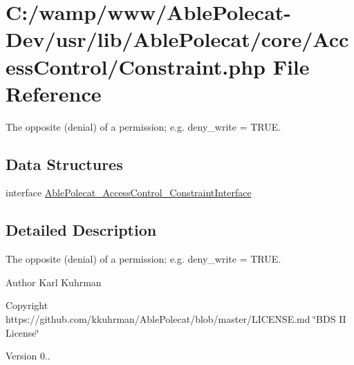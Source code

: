 \hypertarget{_constraint_8php}{}\section{C\+:/wamp/www/\+Able\+Polecat-\/\+Dev/usr/lib/\+Able\+Polecat/core/\+Access\+Control/\+Constraint.php File Reference}
\label{_constraint_8php}


The opposite (denial) of a permission; e.\+g. deny\+\_\+write = T\+R\+U\+E.  


\subsection*{Data Structures}
\begin{DoxyCompactItemize}
\item 
interface \hyperlink{interface_able_polecat___access_control___constraint_interface}{Able\+Polecat\+\_\+\+Access\+Control\+\_\+\+Constraint\+Interface}
\end{DoxyCompactItemize}


\subsection{Detailed Description}
The opposite (denial) of a permission; e.\+g. deny\+\_\+write = T\+R\+U\+E. 

\begin{DoxyAuthor}{Author}
Karl Kuhrman 
\end{DoxyAuthor}
\begin{DoxyCopyright}{Copyright}
https\+://github.com/kkuhrman/\+Able\+Polecat/blob/master/\+L\+I\+C\+E\+N\+S\+E.\+md \char`\"{}\+B\+D\+S I\+I License\char`\"{} 
\end{DoxyCopyright}
\begin{DoxyVersion}{Version}
0.. 
\end{DoxyVersion}
